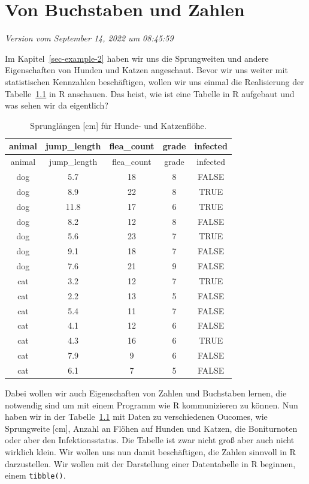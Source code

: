 \documentclass[
  letterpaper,
]{scrbook}
\begin{document}
\hypertarget{sec-letter-number}{%
\chapter{Von Buchstaben und Zahlen}\label{sec-letter-number}}

\emph{Version vom September 14, 2022 um 08:45:59}

Im Kapitel~\ref{sec-example-2} haben wir uns die Sprungweiten und andere
Eigenschaften von Hunden und Katzen angeschaut. Bevor wir uns weiter mit
statistischen Kennzahlen beschäftigen, wollen wir uns einmal die
Realisierung der Tabelle~\ref{tbl-dog-cat-letter} in R anschauen. Das
heist, wie ist eine Tabelle in R aufgebaut und was sehen wir da
eigentlich?

\hypertarget{tbl-dog-cat-letter}{}
\begin{longtable}[]{@{}ccccc@{}}
\caption{\label{tbl-dog-cat-letter}Sprunglängen {[}cm{]} für Hunde- und
Katzenflöhe.}\tabularnewline
\toprule()
animal & jump\_length & flea\_count & grade & infected \\
\midrule()
\endfirsthead
\toprule()
animal & jump\_length & flea\_count & grade & infected \\
\midrule()
\endhead
dog & 5.7 & 18 & 8 & FALSE \\
dog & 8.9 & 22 & 8 & TRUE \\
dog & 11.8 & 17 & 6 & TRUE \\
dog & 8.2 & 12 & 8 & FALSE \\
dog & 5.6 & 23 & 7 & TRUE \\
dog & 9.1 & 18 & 7 & FALSE \\
dog & 7.6 & 21 & 9 & FALSE \\
cat & 3.2 & 12 & 7 & TRUE \\
cat & 2.2 & 13 & 5 & FALSE \\
cat & 5.4 & 11 & 7 & FALSE \\
cat & 4.1 & 12 & 6 & FALSE \\
cat & 4.3 & 16 & 6 & TRUE \\
cat & 7.9 & 9 & 6 & FALSE \\
cat & 6.1 & 7 & 5 & FALSE \\
\bottomrule()
\end{longtable}

Dabei wollen wir auch Eigenschaften von Zahlen und Buchstaben lernen,
die notwendig sind um mit einem Programm wie R kommunizieren zu können.
Nun haben wir in der Tabelle~\ref{tbl-dog-cat-letter} mit Daten zu
verschiedenen Oucomes, wie Sprungweite {[}cm{]}, Anzahl an Flöhen auf
Hunden und Katzen, die Boniturnoten oder aber den Infektionsstatus. Die
Tabelle ist zwar nicht groß aber auch nicht wirklich klein. Wir wollen
uns nun damit beschäftigen, die Zahlen sinnvoll in R darzustellen. Wir
wollen mit der Darstellung einer Datentabelle in R beginnen, einem
\texttt{tibble()}.
\end{document}
